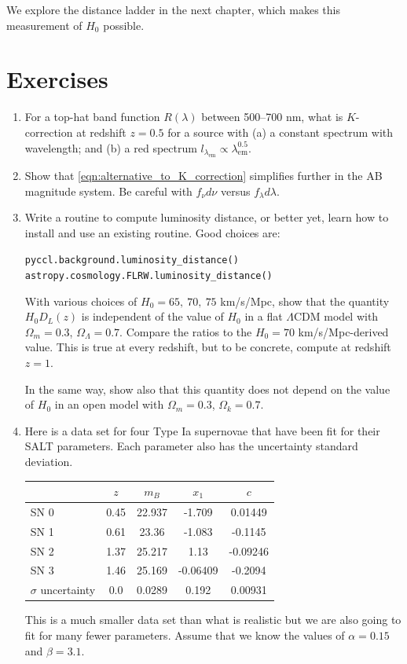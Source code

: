 We explore the distance ladder in the next chapter, which makes this measurement of $H_0$ possible.

\section*{Exercises}


\begin{enumerate}
\item For a top-hat band function $R(\lambda)$ between 500--700 nm, what is $K$-correction at redshift $z=0.5$ for a source with (a) a constant spectrum with wavelength; and (b) a red spectrum $l_{\lambda_\mathrm{em}} \propto \lambda_\mathrm{em}^{0.5}$.
   
  \item Show that \ref{eqn:alternative_to_K_correction} simplifies further in the AB magnitude system.  Be careful with $f_\nu d\nu$ versus $f_\lambda d\lambda$.

  \item Write a routine to compute luminosity distance, or better yet, learn how to install and use an existing routine.  Good choices are:
    
    \texttt{pyccl.background.luminosity\_distance()}  \\
    \texttt{astropy.cosmology.FLRW.luminosity\_distance()}

    With various choices of $H_0 = 65,\ 70,\ 75$ km/s/Mpc, show that the quantity $H_0 D_L(z)$ is independent of the value of $H_0$ in a flat $\Lambda$CDM model with $\Omega_m = 0.3$, $\Omega_\Lambda = 0.7$.  Compare the ratios to the  $H_0 = 70$ km/s/Mpc-derived value.  This is true at every redshift, but to be concrete, compute at redshift $z=1$.

    In the same way, show also that this quantity does not depend on the value of $H_0$ in an open model with $\Omega_m = 0.3$, $\Omega_k = 0.7$.  
    
  \item Here is a data set for four Type Ia supernovae that have been fit for their SALT parameters.  Each parameter also has the uncertainty standard deviation.
    \begin{center}
\begin{tabular}{l|c|c|c|c}
  & $z$ & $m_B$ & $x_1$ & $c$ \\  \hline
SN 0 & 0.45 & 22.937 & -1.709 & 0.01449 \\
SN 1 & 0.61 & 23.36 & -1.083 & -0.1145 \\
SN 2 & 1.37 & 25.217 & 1.13 & -0.09246 \\
SN 3 & 1.46 & 25.169 & -0.06409 & -0.2094 \\
\hline
$\sigma$ uncertainty & 0.0 & 0.0289 & 0.192 & 0.00931 \\
\end{tabular}
    \end{center}
    This is a much smaller data set than what is realistic but we are also going to fit for many fewer parameters.  Assume that we know the values of $\alpha = 0.15$ and $\beta = 3.1$.
    

\end{enumerate}
